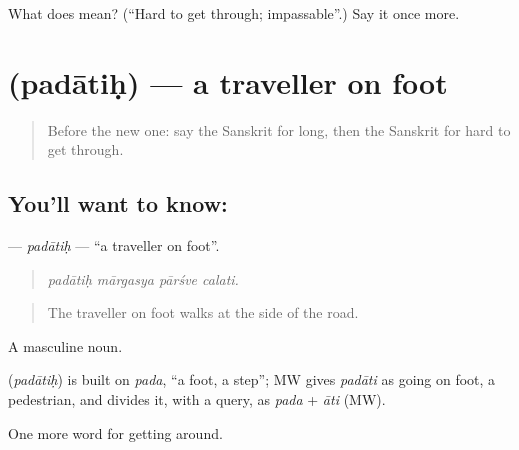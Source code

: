 \begin{tcolorbox}[breakable,colback=teal!4,colframe=teal!35!black,title={Before you move on}]
What does  mean? (\textquotedblleft{}Hard to get through; impassable\textquotedblright{}.) Say it once more.
\end{tcolorbox}
\section[\texorpdfstring{\sk{पदातिः} (padātiḥ)}{पदातिः (padātiḥ)}]{ (padātiḥ) — a traveller on foot}

\label{lesson:SA-C403-padatih}



\begin{quote}
Before the new one: say the Sanskrit for long, then the Sanskrit for hard to get through.
\end{quote}

\subsection*{You'll want to know: }
\textbf{} — \emph{padātiḥ} — \textquotedblleft{}a traveller on foot\textquotedblright{}.

\begin{quote}
   
\end{quote}

\begin{quote}
\emph{padātiḥ mārgasya pārśve calati.}
\end{quote}

\begin{quote}
The traveller on foot walks at the side of the road.
\end{quote}

A masculine noun.

\begin{cousinweb}
\textbf{} (\emph{padātiḥ}) is built on \emph{pada}, \textquotedblleft{}a foot, a step\textquotedblright{}; MW gives \emph{padāti} as going on foot, a pedestrian, and divides it, with a query, as \emph{pada} + \emph{āti} (MW).
\end{cousinweb}

\begin{grammarlens}[title={What you've built}]
One more word for getting around.
\end{grammarlens}

